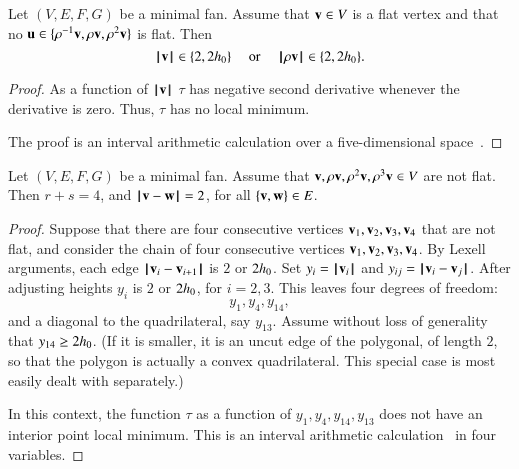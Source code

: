 
\begin{lemma}  %
Let $(V,E,F,G)$ be a minimal fan.
Assume that ${\mathbf v}\in V$ is a flat vertex and that no ${\mathbf u}\in\{\rho^{-1}{\mathbf v},\rho {\mathbf v},\rho^2 {\mathbf v}\}$ is flat.
Then 
$$
{{\hskip0.1em|\hskip-0.15em|\hskip0.1em}{\mathbf v}{\hskip0.1em|\hskip-0.15em|\hskip0.1em}}\in \{2,2{h_0}\}\quad\text{ or }\quad{{\hskip0.1em|\hskip-0.15em|\hskip0.1em}\rho {\mathbf v}{\hskip0.1em|\hskip-0.15em|\hskip0.1em}}\in \{2,2{h_0}\}.
$$
\end{lemma}

\begin{proof}
As a function of ${{\hskip0.1em|\hskip-0.15em|\hskip0.1em}{\mathbf v}{\hskip0.1em|\hskip-0.15em|\hskip0.1em}}$
 $\tau$ has negative second derivative whenever the derivative is zero.  Thus, $\tau$ has no local minimum.

The proof is an interval arithmetic calculation over a five-dimensional space~\cite[cc:d2b]{hales:2009:nonlinear}. %
\end{proof}





\begin{lemma}\rating{}
Let $(V,E,F,G)$ be a minimal fan.
Assume that ${\mathbf v},\rho {\mathbf v},\rho^2 {\mathbf v},\rho^3 {\mathbf v}\in V$ are not flat.
Then $r+s=4$, and ${\hskip0.1em|\hskip-0.15em|\hskip0.1em}{\mathbf v} - {\mathbf w}{\hskip0.1em|\hskip-0.15em|\hskip0.1em}= 2$, for all $\{{\mathbf v},{\mathbf w}\}\in E$.
\end{lemma}
%

\begin{proof} 
Suppose that there are four consecutive vertices ${\mathbf v}_1,{\mathbf v}_2,{\mathbf v}_3,{\mathbf v}_4$ that are not flat, and consider the chain of four consecutive vertices ${\mathbf v}_1,{\mathbf v}_2,{\mathbf v}_3,{\mathbf v}_4$. By Lexell arguments, each edge ${\hskip0.1em|\hskip-0.15em|\hskip0.1em}{\mathbf v}_i - {\mathbf v}_{i+1}{\hskip0.1em|\hskip-0.15em|\hskip0.1em}$ is $2$ or $2{h_0}$. Set $y_i = {{\hskip0.1em|\hskip-0.15em|\hskip0.1em}{\mathbf v}_i{\hskip0.1em|\hskip-0.15em|\hskip0.1em}}$ and $y_{ij} = {\hskip0.1em|\hskip-0.15em|\hskip0.1em}{\mathbf v}_i - {\mathbf v}_j{\hskip0.1em|\hskip-0.15em|\hskip0.1em}$. After adjusting heights $y_i$ is $2$ or $2{h_0}$, for $i=2,3$. This leaves four degrees of freedom:
$$
y_1,y_4,y_{14},
$$
and a diagonal to the quadrilateral, say $y_{13}$. Assume without loss of generality that  $y_{14}\ge 2{h_0}$.  (If it is smaller, it is an uncut edge of the polygonal, of length $2$, so that the polygon is actually a convex quadrilateral.  This special case is most easily dealt with separately.)

In this context, the function $\tau$ as a function of $y_1,y_4,y_{14},y_{13}$ does not have an interior point local minimum.
This is an interval arithmetic calculation~\cite[cc:qua]{hales:2009:nonlinear} in four variables.%
\end{proof}

